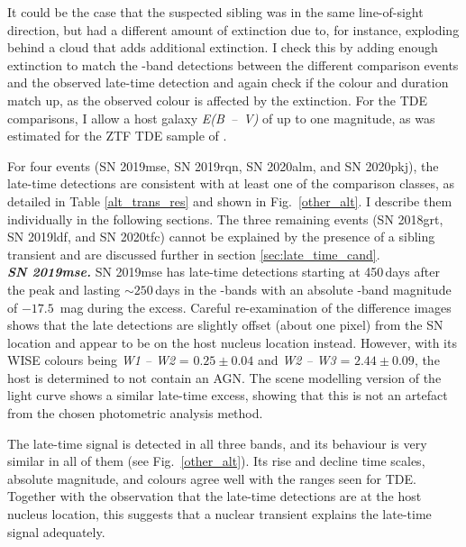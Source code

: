 \documentclass[a4paper,oneside,12pt, class=Latex/Classes/PhDthesisPSnPDF, crop=false]{standalone}
\begin{document}
It could be the case that the suspected sibling was in the same line-of-sight direction, but had a different amount of extinction due to, for instance, exploding behind a cloud that adds additional extinction. I check this by adding enough extinction to match the \ztfr-band detections between the different comparison events and the observed late-time detection and again check if the colour and duration match up, as the observed colour is affected by the extinction. For the TDE comparisons, I allow a host galaxy \textit{E(B~--~V)} of up to one magnitude, as was estimated for the ZTF TDE sample of \citet{TDE_host_ext_range}.

For four events (SN 2019mse, SN 2019rqn, SN 2020alm, and SN 2020pkj), the late-time detections are consistent with at least one of the comparison classes, as detailed in Table \ref{alt_trans_res} and shown in Fig.~\ref{other_alt}. I describe them individually in the following sections. The three remaining events (SN 2018grt, SN 2019ldf, and SN 2020tfc) cannot be explained by the presence of a sibling transient and are discussed further in section \ref{sec:late_time_cand}.\\

\textit{\textbf{SN 2019mse.}}
SN 2019mse has late-time detections starting at 450\,days after the peak and lasting $\sim250$\,days in the \ztfg\ztfr\ztfi-bands with an absolute \ztfr-band magnitude of $-17.5$~mag during the excess. Careful re-examination of the difference images shows that the late detections are slightly offset (about one pixel) from the SN location and appear to be on the host nucleus location instead. However, with its WISE colours being \textit{W1 -- W2} = $0.25\pm0.04$ and \textit{W2 -- W3} = $2.44\pm0.09$, the host is determined to not contain an AGN. The scene modelling version of the light curve shows a similar late-time excess, showing that this is not an artefact from the chosen photometric analysis method.

The late-time signal is detected in all three bands, and its behaviour is very similar in all of them (see Fig.~\ref{other_alt}). Its rise and decline time scales, absolute magnitude, and colours agree well with the ranges seen for TDE. Together with the observation that the late-time detections are at the host nucleus location, this suggests that a nuclear transient explains the late-time signal adequately.\\
\end{document}
